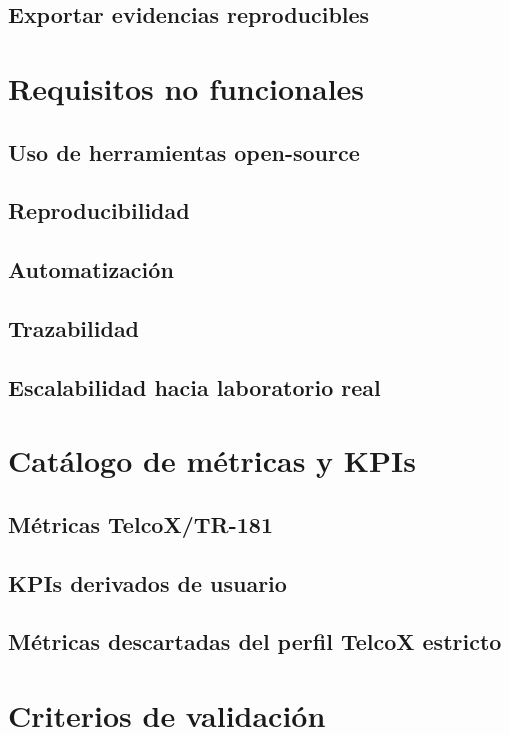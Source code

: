 \subsection{Exportar evidencias reproducibles}
\label{subsec:exportar-evidencias-reproducibles}

\section{Requisitos no funcionales}
\label{sec:requisitos-no-funcionales}

\subsection{Uso de herramientas open-source}
\label{subsec:uso-herramientas-open-source}

\subsection{Reproducibilidad}
\label{subsec:reproducibilidad}

\subsection{Automatización}
\label{subsec:automatizacion}

\subsection{Trazabilidad}
\label{subsec:trazabilidad}

\subsection{Escalabilidad hacia laboratorio real}
\label{subsec:escalabilidad-laboratorio-real}

\section{Catálogo de métricas y KPIs}
\label{sec:catalogo-metricas-kpis}

\subsection{Métricas TelcoX/TR-181}
\label{subsec:metricas-telcox-tr181}

\subsection{KPIs derivados de usuario}
\label{subsec:kpis-derivados-usuario}

\subsection{Métricas descartadas del perfil TelcoX estricto}
\label{subsec:metricas-descartadas-perfil-telcox-estricto}

\section{Criterios de validación}
\label{sec:criterios-validacion}